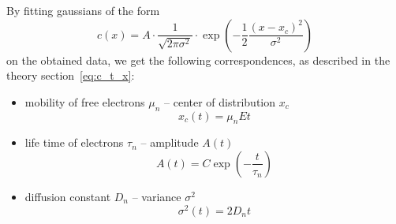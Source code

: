 By fitting gaussians of the form 
\begin{equation}
    c(x) = A \cdot \frac{1}{\sqrt{2 \pi \sigma^2}} 
    \cdot \exp\left( -\frac{1}{2}\frac{\left( x - x_c \right)^2}{\sigma^2} \right)
    \label{eq:gaussian}
\end{equation}
on the obtained data, we get the following 
correspondences, as described in the theory section~\ref{eq:c_t_x}: 
\begin{itemize}
    \label{sec:transform_x_t}
    \item
        mobility of free electrons $\mu_n$ -- 
        center of distribution $x_c$
        \begin{equation}
            x_c(t) = \mu_n E t
            \label{eq:x_c}
        \end{equation}
    \item
        life time of electrons $\tau_n$ --
        amplitude $A(t)$
        \begin{equation}
            A(t) = C \exp\left(-\frac{t}{\tau_n}\right)
        \end{equation}
    \item
        diffusion constant $D_n$ --
        variance $\sigma^2$
        \begin{equation}
            \sigma^2(t) = 2 D_n t
        \end{equation}
\end{itemize}

